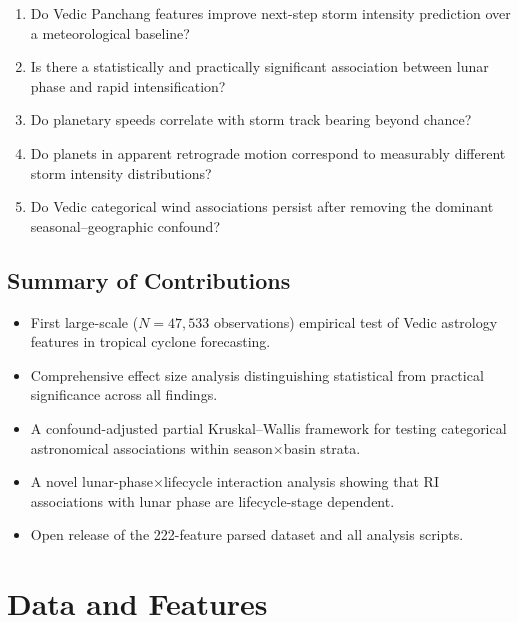 \documentclass[12pt,a4paper]{article}
\begin{document}
\begin{enumerate}[label=\textbf{RQ\arabic*.}]
  \item Do Vedic Panchang features improve next-step storm intensity prediction
        over a meteorological baseline?
  \item Is there a statistically and practically significant association between
        lunar phase and rapid intensification?
  \item Do planetary speeds correlate with storm track bearing beyond chance?
  \item Do planets in apparent retrograde motion correspond to measurably
        different storm intensity distributions?
  \item Do Vedic categorical wind associations persist after removing the
        dominant seasonal--geographic confound?
\end{enumerate}

\subsection*{Summary of Contributions}

\begin{itemize}
  \item First large-scale ($N = 47{,}533$ observations) empirical test of Vedic
        astrology features in tropical cyclone forecasting.
  \item Comprehensive effect size analysis distinguishing statistical from
        practical significance across all findings.
  \item A confound-adjusted partial Kruskal--Wallis framework for testing
        categorical astronomical associations within season$\times$basin strata.
  \item A novel lunar-phase$\times$lifecycle interaction analysis showing that
        RI associations with lunar phase are lifecycle-stage dependent.
  \item Open release of the 222-feature parsed dataset and all analysis scripts.
\end{itemize}

\section{Data and Features}
\label{sec:data}
\end{document}
